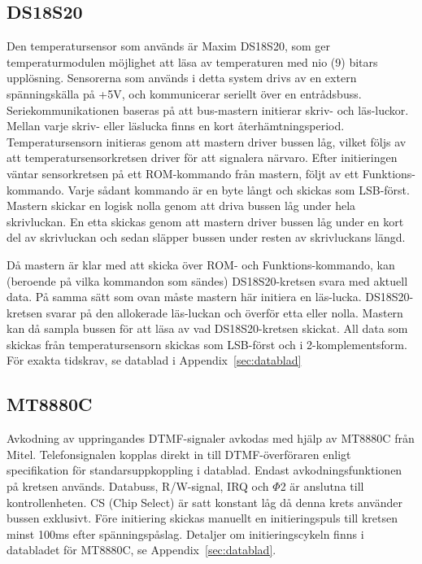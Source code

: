 \documentclass[a4paper,11pt]{article}
\begin{document}
	\subsection{DS18S20}
	\label{DS18S20}
		Den temperatursensor som används är Maxim DS18S20, som ger temperaturmodulen möjlighet att läsa av temperaturen
		med nio (9) bitars upplösning. Sensorerna som används i detta system drivs av en extern spänningskälla på +5V,
		och kommunicerar seriellt över en entrådsbuss. Seriekommunikationen baseras på att bus-mastern initierar skriv-
		och läs-luckor. Mellan varje skriv- eller läslucka finns en kort återhämtningsperiod. Temperatursensorn initieras genom att mastern
		driver bussen låg, vilket följs av att temperatursensorkretsen driver för att signalera närvaro.
		Efter initieringen väntar sensorkretsen på ett ROM-kommando från mastern,
		följt av ett Funktions-kommando. Varje sådant kommando är en byte långt och skickas som LSB-först. Mastern skickar
		en logisk nolla genom att driva bussen låg under hela skrivluckan. En etta skickas genom att mastern driver bussen låg
		under en kort del av skrivluckan och sedan släpper bussen under resten av skrivluckans längd. 

		Då mastern är klar med att skicka över ROM- och Funktions-kommando, kan (beroende på vilka kommandon som sändes) DS18S20-kretsen
		svara med aktuell data. På samma sätt som ovan måste mastern här initiera en läs-lucka. 
		DS18S20-kretsen svarar på den allokerade läs-luckan och överför etta eller nolla. Mastern kan då sampla bussen för att läsa av vad DS18S20-kretsen skickat. All data som skickas från
		temperatursensorn skickas som LSB-först och i 2-komplementsform. För exakta tidskrav, se datablad i Appendix~\ref{sec:datablad}
		

	\subsection{MT8880C}
	\label{MT8880C}
		Avkodning av uppringandes DTMF-signaler avkodas med hjälp av MT8880C från Mitel. 
		Telefonsignalen kopplas direkt in till DTMF-överföraren enligt specifikation för standarsuppkoppling i datablad. Endast avkodningsfunktionen på 		kretsen används. Databuss, R/W-signal, IRQ och $\Phi$2 är anslutna till kontrollenheten. 
		CS (Chip Select) är satt konstant låg då denna krets använder bussen exklusivt. 
Före initiering skickas manuellt en initieringspuls till kretsen minst 100ms efter spänningspåslag. Detaljer om initieringscykeln finns i databladet för MT8880C, se Appendix~\ref{sec:datablad}.
\end{document}
